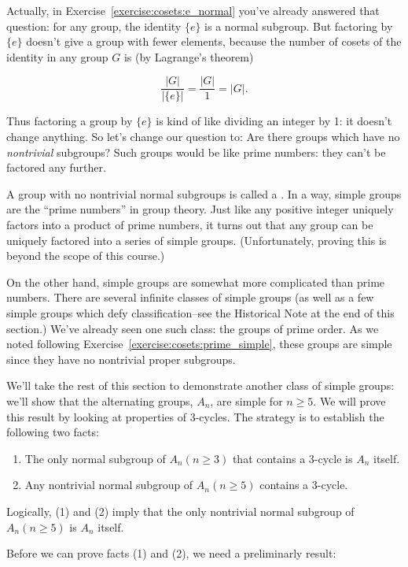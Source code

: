{Actually, in Exercise~\ref{exercise:cosets:e_normal} you've already answered that question: for any group, the identity $\{e\}$ is a normal subgroup.  But factoring by $\{e\}$ doesn't give a group with fewer elements, because the number of cosets of the identity in any group $G$ is (by Lagrange's theorem)

\[ \frac{|G|}{|\{e\}|} = \frac{|G|}{1} = |G|. \]

\noindent
Thus factoring a group by $\{e\}$ is kind of like dividing an integer by 1: it doesn't change anything. So let's change our question to:  Are there groups which have no \emph{nontrivial} subgroups? Such groups would be like prime numbers: they can't be factored any further.

A group with no nontrivial normal subgroups is called a . In a way, simple groups are the ``prime  numbers'' in group theory. Just like any positive integer uniquely factors into a product of prime numbers,  it turns out that any group can be uniquely factored into a series of simple groups.  (Unfortunately, proving this is beyond the scope of this course.) 

On the other hand, simple groups are somewhat more complicated than prime numbers. There are several infinite classes of simple groups (as well as a few simple groups which defy classification--see the Historical Note at the end of this section.) We've already seen one such  class: the groups of prime order. As we noted following Exercise~\ref{exercise:cosets:prime_simple}, these groups are simple since they have
no nontrivial proper subgroups. 

We'll take the rest of this section to demonstrate another class of simple groups: we'll show that the alternating groups, $A_n$, are simple for
$n \geq 5$. We will prove this result by looking at properties of 3-cycles. The strategy is to establish the following two facts:
\begin{enumerate}[(1)]
\item
The only  normal subgroup of $A_n (n \geq 3)$ that contains a 3-cycle is $A_n$ itself.
\item
Any nontrivial normal subgroup of $A_n (n \geq 5)$ contains a 3-cycle.
\end{enumerate}
Logically, (1) and (2)  imply that the only nontrivial normal subgroup of $A_n (n \geq 5)$ is $A_n$ itself.

Before we can prove facts (1) and (2), we need a preliminarly result: 

}
